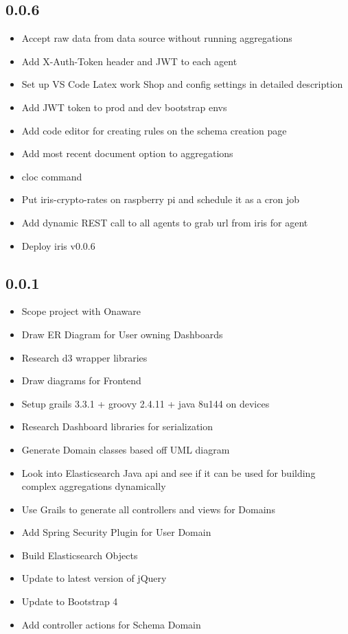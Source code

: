 \subsection*{0.0.6}
\begin{itemize}
\item Accept raw data from data source without running aggregations
\item Add X-Auth-Token header and JWT to each agent
\item Set up VS Code Latex work Shop and config settings in detailed description
\item Add JWT token to prod and dev bootstrap envs
\item Add code editor for creating rules on the schema creation page
\item Add most recent document option to aggregations
\item cloc command
\item Put iris-crypto-rates on raspberry pi and schedule it as a cron job
\item Add dynamic REST call to all agents to grab url  from iris for agent
\item Deploy iris v0.0.6
\end{itemize}
\subsection*{0.0.1}
\begin{itemize}
\item Scope project with Onaware
\item Draw ER Diagram for User owning Dashboards
\item Research d3 wrapper libraries
\item Draw diagrams for Frontend
\item Setup grails 3.3.1 + groovy 2.4.11 + java 8u144 on devices
\item Research Dashboard libraries for serialization
\item Generate Domain classes based off UML diagram
\item Look into Elasticsearch Java api and see if it can be used for building complex aggregations dynamically
\item Use Grails to generate all controllers and views for Domains
\item Add Spring Security Plugin for User Domain
\item Build Elasticsearch Objects
\item Update to latest version of jQuery
\item Update to Bootstrap 4
\item Add controller actions for Schema Domain
\end{itemize}
